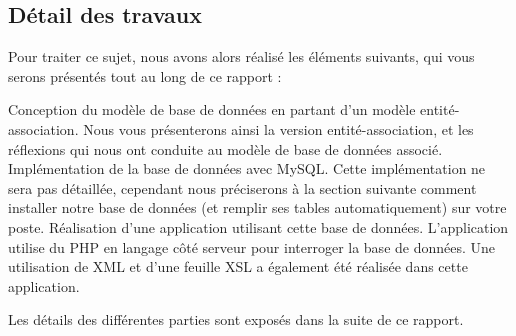 \subsection{Détail des travaux}
Pour traiter ce sujet, nous avons alors réalisé les éléments suivants, qui vous serons présentés tout au long de ce rapport :
\begin{itemize}
  \itemperso{}Conception du modèle de base de données en partant d'un modèle entité-association. Nous vous présenterons ainsi la version entité-association, et les réflexions qui nous ont conduite au modèle de base de données associé.
  \itemperso{}Implémentation de la base de données avec MySQL. Cette implémentation ne sera pas détaillée, cependant nous préciserons à la section suivante comment installer notre base de données (et remplir ses tables automatiquement) sur votre poste.
  \itemperso{}Réalisation d'une application utilisant cette base de données. L'application utilise du PHP en langage côté serveur pour interroger la base de données. Une utilisation de XML et d'une feuille XSL a également été réalisée dans cette application.
\end{itemize}
Les détails des différentes parties sont exposés dans la suite de ce rapport.


